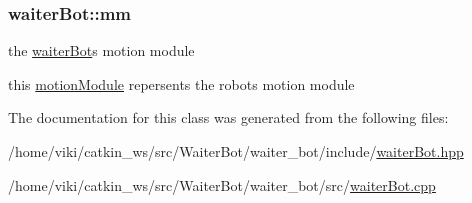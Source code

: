 \subsubsection[{\texorpdfstring{mm}{mm}}]{ waiter\+Bot\+::mm}\hypertarget{classwaiterBot_aa477504a694726fc90b8e6fa4bcc9998}{}\label{classwaiterBot_aa477504a694726fc90b8e6fa4bcc9998}


the \hyperlink{classwaiterBot}{waiter\+Bot}\textquotesingle{}s motion module 

this \hyperlink{classmotionModule}{motion\+Module} repersents the robot\textquotesingle{}s motion module 

The documentation for this class was generated from the following files\+:\begin{DoxyCompactItemize}
\item 
/home/viki/catkin\+\_\+ws/src/\+Waiter\+Bot/waiter\+\_\+bot/include/\hyperlink{waiterBot_8hpp}{waiter\+Bot.\+hpp}\item 
/home/viki/catkin\+\_\+ws/src/\+Waiter\+Bot/waiter\+\_\+bot/src/\hyperlink{waiterBot_8cpp}{waiter\+Bot.\+cpp}\end{DoxyCompactItemize}
